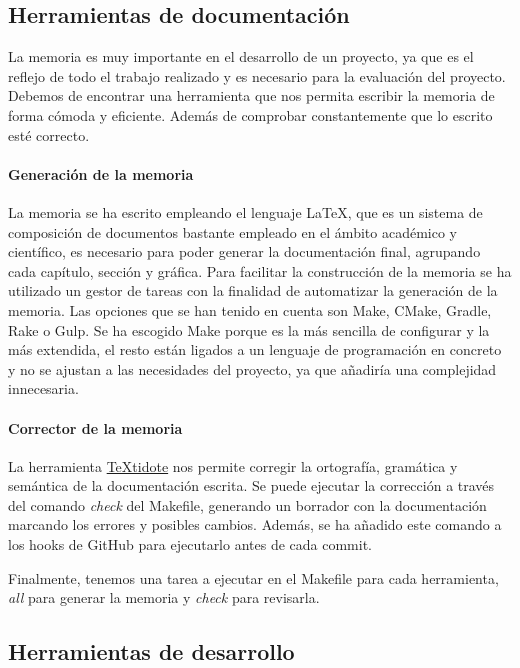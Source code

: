 \subsection{Herramientas de documentación}
La memoria es muy importante en el desarrollo de un proyecto, ya que es el reflejo de todo el trabajo realizado y es necesario para la evaluación del proyecto.
Debemos de encontrar una herramienta que nos permita escribir la memoria de forma cómoda y eficiente. Además de comprobar constantemente que lo escrito esté correcto.

\paragraph*{Generación de la memoria}
La memoria se ha escrito empleando el lenguaje LaTeX, que es un sistema de composición de documentos bastante empleado
en el ámbito académico y científico, es necesario para poder generar la documentación final, agrupando cada capítulo, sección y
gráfica. Para facilitar la construcción de la memoria se ha utilizado un gestor de tareas con la finalidad de automatizar la generación de la memoria.
Las opciones que se han tenido en cuenta son Make, CMake, Gradle, Rake o Gulp. Se ha escogido Make porque es la más sencilla de configurar y la más extendida, el resto
están ligados a un lenguaje de programación en concreto y no se ajustan a las necesidades del proyecto, ya que añadiría una complejidad innecesaria.

\paragraph*{Corrector de la memoria}
La herramienta \href{https://github.com/sylvainhalle/textidote}{TeXtidote} nos permite corregir la ortografía, gramática y semántica de la documentación escrita. Se puede ejecutar la corrección a través del comando \textit{check} del Makefile,
generando un borrador con la documentación marcando los errores y posibles cambios. Además, se ha añadido este comando a los hooks de GitHub para ejecutarlo antes de cada commit.

Finalmente, tenemos una tarea a ejecutar en el Makefile para cada herramienta, \textit{all} para generar la memoria y \textit{check} para revisarla.

\subsection{Herramientas de desarrollo}


